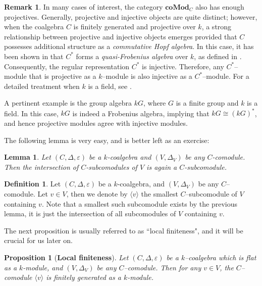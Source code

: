 \documentclass{article}
\theoremstyle{plain}
\newtheorem{Lemma}[Th]{Lemma}
\newtheorem{Prop}[Th]{Proposition}
\theoremstyle{definition}
\newtheorem{Def}[Th]{Definition}
\newtheorem{Rem}[Th]{Remark}
\begin{document}
\begin{Rem}\label{projectives are injectives}
In many cases of interest, the category $\mathbf{coMod}_C$ also has enough projectives. Generally, projective and injective objects are quite distinct; however, when the coalgebra $C$ is finitely generated and projective over $k$, a strong relationship between projective and injective objects emerges provided that $C$ possesses additional structure as a \textit{commutative Hopf algebra}. In this case, it has been shown in \cite{Par71} that $C^\ast$ forms a \textit{quasi-Frobenius algebra} over $k$, as defined in \cite{Mul64}. Consequently, the regular representation $C^\ast$ is injective. Therefore, any $C^\ast$--module that is projective as a $k$--module is also injective as a $C^\ast$--module. For a detailed treatment when $k$ is a field, see \cite[Chapter 9]{DV94}.


A pertinent example is the group algebra $kG$, where $G$ is a finite group and $k$ is a field. In this case, $kG$ is indeed a Frobenius algebra, implying that $kG\cong (kG)^\ast$, and hence projective modules agree with injective modules.
    \end{Rem}



The following lemma is very easy, and is better left as an exercise:

\begin{Lemma}
    Let $(C, \Delta, \varepsilon)$ be a $k$-coalgebra and $(V, \Delta_V)$ be any $C$-comodule. Then the intersection of $C$-subcomodules of $V$ is again a $C$-subcomodule.
\end{Lemma}

\begin{Def}
    Let $(C, \Delta, \varepsilon)$ be a $k$-coalgebra, and $(V, \Delta_V)$ be any $C$--comodule. Let $v\in V$, then we denote by $\langle v \rangle$ the smallest $C$--subcomodule of $V$ containing $v$. Note that a smallest such subcomodule exists by the previous lemma, it is just the intersection of all subcomodules of $V$ containing $v$.
\end{Def}

The next proposition is usually referred to as ``local finiteness", and it will be crucial for us later on.

\begin{Prop}[\textbf{Local finiteness}]
    Let $(C, \Delta, \varepsilon)$ be a $k$--coalgebra which is flat as a $k$-module, and $(V, \Delta_V)$ be any $C$--comodule. Then for any $v\in V$, the $C$--comodule  $\langle v \rangle$ is finitely generated as a $k$-module. 
\end{Prop}
\end{document}
